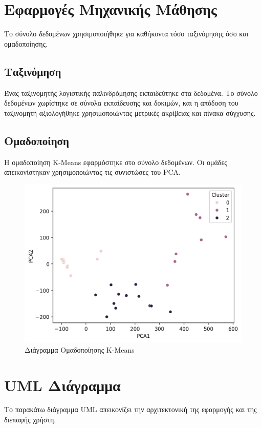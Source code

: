 \documentclass{article}
\begin{document}
\section{Εφαρμογές Μηχανικής Μάθησης}
Το σύνολο δεδομένων χρησιμοποιήθηκε για καθήκοντα τόσο ταξινόμησης όσο και ομαδοποίησης.

\subsection{Ταξινόμηση}
Ένας ταξινομητής λογιστικής παλινδρόμησης εκπαιδεύτηκε στα δεδομένα. Το σύνολο δεδομένων χωρίστηκε σε σύνολα εκπαίδευσης και δοκιμών, και η απόδοση του ταξινομητή αξιολογήθηκε χρησιμοποιώντας μετρικές ακρίβειας και πίνακα σύγχυσης.

\subsection{Ομαδοποίηση}
Η ομαδοποίηση K-Means εφαρμόστηκε στο σύνολο δεδομένων. Οι ομάδες απεικονίστηκαν χρησιμοποιώντας τις συνιστώσες του PCA.

\begin{figure}[h]
    \centering
    \includegraphics[width=\textwidth]{kmeans_plot.png}
    \caption{Διάγραμμα Ομαδοποίησης K-Means}
    \label{fig:kmeans}
\end{figure}

\section{UML Διάγραμμα}
Το παρακάτω διάγραμμα UML απεικονίζει την αρχιτεκτονική της εφαρμογής και της διεπαφής χρήστη. 
\end{document}
